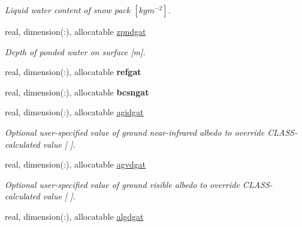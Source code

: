 \begin{DoxyCompactItemize}
\begin{DoxyCompactList}\small\item\em Liquid water content of snow pack $[kg m^{-2} ]$. \end{DoxyCompactList}\item 
\hypertarget{structclass__statevars_1_1class__gather_acbe6f54a24c8f4561cee7fc3613e1ec2}{}real, dimension(\+:), allocatable \hyperlink{structclass__statevars_1_1class__gather_acbe6f54a24c8f4561cee7fc3613e1ec2}{zpndgat}\label{structclass__statevars_1_1class__gather_acbe6f54a24c8f4561cee7fc3613e1ec2}

\begin{DoxyCompactList}\small\item\em Depth of ponded water on surface \mbox{[}m\mbox{]}. \end{DoxyCompactList}\item 
\hypertarget{structclass__statevars_1_1class__gather_ac5adac8690fbd3b558623073a0bb6e92}{}real, dimension(\+:), allocatable {\bfseries refgat}\label{structclass__statevars_1_1class__gather_ac5adac8690fbd3b558623073a0bb6e92}

\item 
\hypertarget{structclass__statevars_1_1class__gather_a8fa3a361996ae8fd0df50d2bf5253401}{}real, dimension(\+:), allocatable {\bfseries bcsngat}\label{structclass__statevars_1_1class__gather_a8fa3a361996ae8fd0df50d2bf5253401}

\item 
\hypertarget{structclass__statevars_1_1class__gather_a45c24e7f4ad03823b9d7da4222fe2f31}{}real, dimension(\+:), allocatable \hyperlink{structclass__statevars_1_1class__gather_a45c24e7f4ad03823b9d7da4222fe2f31}{agidgat}\label{structclass__statevars_1_1class__gather_a45c24e7f4ad03823b9d7da4222fe2f31}

\begin{DoxyCompactList}\small\item\em Optional user-\/specified value of ground near-\/infrared albedo to override C\+L\+A\+S\+S-\/calculated value \mbox{[} \mbox{]}. \end{DoxyCompactList}\item 
\hypertarget{structclass__statevars_1_1class__gather_adb39a90e09a3f4d14717f029d34b57d5}{}real, dimension(\+:), allocatable \hyperlink{structclass__statevars_1_1class__gather_adb39a90e09a3f4d14717f029d34b57d5}{agvdgat}\label{structclass__statevars_1_1class__gather_adb39a90e09a3f4d14717f029d34b57d5}

\begin{DoxyCompactList}\small\item\em Optional user-\/specified value of ground visible albedo to override C\+L\+A\+S\+S-\/calculated value \mbox{[} \mbox{]}. \end{DoxyCompactList}\item 
\hypertarget{structclass__statevars_1_1class__gather_a342220d2d2293119542fb0b7810c6b86}{}real, dimension(\+:), allocatable \hyperlink{structclass__statevars_1_1class__gather_a342220d2d2293119542fb0b7810c6b86}{algdgat}\label{structclass__statevars_1_1class__gather_a342220d2d2293119542fb0b7810c6b86}


\end{DoxyCompactItemize}
